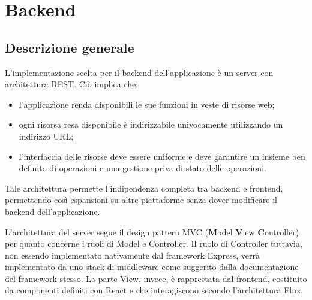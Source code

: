 \section{Backend}


\subsection{Descrizione generale}
L'implementazione scelta per il backend dell'applicazione è un server con architettura REST. Ciò implica che:
\begin{itemize}
\item l'applicazione renda disponibili le sue funzioni in veste di risorse web;
\item ogni risorsa resa disponibile è indirizzabile univocamente utilizzando un indirizzo URL;
\item l'interfaccia delle risorse deve essere uniforme e deve garantire un insieme ben definito di operazioni e una gestione priva di stato delle operazioni.
\end{itemize}

Tale architettura permette l'indipendenza completa tra backend e frontend, permettendo così espansioni su altre piattaforme senza dover modificare il backend dell'applicazione.

L'architettura del server segue il design pattern MVC (\textbf{M}odel \textbf{V}iew \textbf{C}ontroller) per quanto concerne i ruoli di Model e Controller. 
Il ruolo di Controller tuttavia, non essendo implementato nativamente dal framework Express, verrà implementato da uno stack di middleware come suggerito dalla documentazione del framework stesso.
La parte View, invece, è rapprestata dal frontend, costituito da componenti definiti con React e che interagiscono secondo l'architettura Flux.

